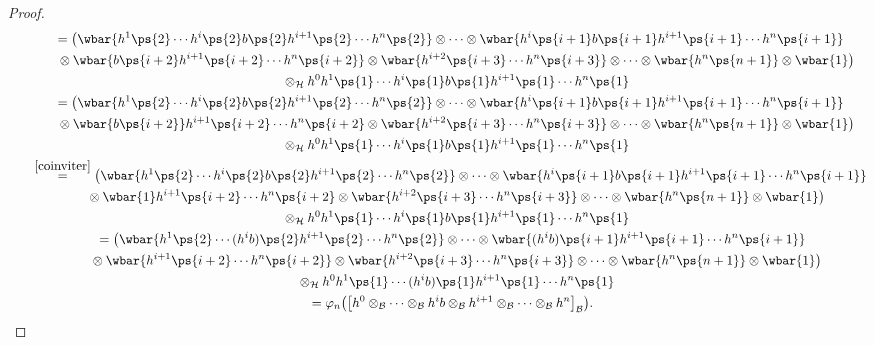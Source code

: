 \begin{proof}
\begin{gather*}
\qquad
=\big(\wbar{h^1\ps{2}\cdots h^i\ps{2}b\ps{2}h^{i+1}\ps{2}\cdots h^n\ps{2}}\otimes\dots\otimes
\wbar{h^i\ps{i+1}b\ps{i+1}h^{i+1}\ps{i+1}\cdots h^n\ps{i+1}}
\\
\qquad\phantom{=}{} \otimes
\wbar{b\ps{i+2}h^{i+1}\ps{i+2}\cdots h^n\ps{i+2}} \otimes \wbar{h^{i+2}\ps{i+3}\cdots
h^n\ps{i+3}}\otimes\cdots\otimes\wbar{h^n\ps{n+1}} \otimes \wbar{1}\big) \\
\qquad\phantom{=}{} \otimes_{\cal H}
h^0h^1\ps{1}\cdots h^{i}\ps{1}b\ps{1}h^{i+1}\ps{1}\cdots h^n\ps{1}
\\
\qquad
=\big(\wbar{h^1\ps{2}\cdots h^i\ps{2}b\ps{2}h^{i+1}\ps{2}\cdots h^n\ps{2}}\otimes\dots\otimes
\wbar{h^i\ps{i+1}b\ps{i+1}h^{i+1}\ps{i+1}\cdots h^n\ps{i+1}}
\\
\qquad\phantom{=}{} \otimes
\wbar{b\ps{i+2}}h^{i+1}\ps{i+2}\cdots h^n\ps{i+2} \otimes \wbar{h^{i+2}\ps{i+3}\cdots
h^n\ps{i+3}}\otimes\cdots\otimes\wbar{h^n\ps{n+1}} \otimes \wbar{1}\big) \\
\qquad\phantom{=}{}\otimes_{\cal H}
h^0h^1\ps{1}\cdots h^{i}\ps{1}b\ps{1}h^{i+1}\ps{1}\cdots h^n\ps{1}
\\
\qquad
\stackrel{\eqref{coinviter}}{=}
\big(\wbar{h^1\ps{2}\cdots h^i\ps{2}b\ps{2}h^{i+1}\ps{2}\cdots h^n\ps{2}}\otimes\dots\otimes
\wbar{h^i\ps{i+1}b\ps{i+1}h^{i+1}\ps{i+1}\cdots h^n\ps{i+1}}
\\
\qquad\phantom{=}{}
\otimes
\wbar{1}h^{i+1}\ps{i+2}\cdots h^n\ps{i+2} \otimes \wbar{h^{i+2}\ps{i+3}\cdots
h^n\ps{i+3}}\otimes\cdots\otimes\wbar{h^n\ps{n+1}} \otimes \wbar{1}\big) \\
\qquad\phantom{=}{} \otimes_{\cal H}
h^0h^1\ps{1}\cdots h^{i}\ps{1}b\ps{1}h^{i+1}\ps{1}\cdots h^n\ps{1}
\\
\qquad{}
=\big(\wbar{h^1\ps{2}\cdots (h^ib)\ps{2}h^{i+1}\ps{2}\cdots h^n\ps{2}}\otimes\cdots\otimes
\wbar{(h^ib)\ps{i+1}h^{i+1}\ps{i+1}\cdots h^n\ps{i+1}}
\\
\qquad\phantom{=}{} \otimes
\wbar{h^{i+1}\ps{i+2}\cdots h^n\ps{i+2}} \otimes \wbar{h^{i+2}\ps{i+3}\cdots
h^n\ps{i+3}}\otimes\cdots\otimes\wbar{h^n\ps{n+1}} \otimes \wbar{1}\big) \\
\qquad\phantom{=}{} \otimes_{\cal H}
h^0h^1\ps{1}\cdots (h^{i}b)\ps{1}h^{i+1}\ps{1}\cdots h^n\ps{1}
\\
\qquad{}
=\varphi_n\big(\big[h^0\otimes_{\cal B}\cdots\otimes_{\cal B} h^ib\otimes_{\cal B} h^{i+1}\otimes_{\cal
B}\cdots\otimes_{\cal B} h^n\big]_{\cal B}\big).
\end{gather*}


\end{proof}
